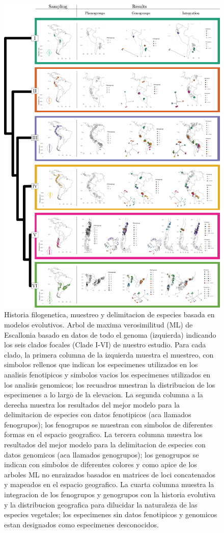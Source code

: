 \documentclass[
  11pt,
]{article}
\begin{document}
\setcounter{figure}{0}
\setcounter{table}{0}
\let\thefigure=\oldthefigure
\let\thetable=\oldthetable

\begin{figure}

{\centering \includegraphics[width=0.7\linewidth,]{figures/Figure1} 

}

\caption{Historia filogenetica, muestreo y delimitacion de especies basada en modelos evolutivos. Arbol de maxima verosimilitud (ML) de Escallonia basado en datos de todo el genoma (izquierda) indicando los seis clados focales (Clade I-VI) de nuestro estudio. Para cada clado, la primera columna de la izquierda muestra el muestreo, con simbolos rellenos que indican los especimenes utilizados en los analisis fenotipicos y simbolos vacios los especimenes utilizados en los analisis genomicos; los recuadros muestran la distribucion de los especimenes a lo largo de la elevacion. La segunda columna a la derecha muestra los resultados del mejor modelo para la delimitacion de especies con datos fenotipicos (aca llamados fenogrupos); los fenogrupos se muestran con simbolos de diferentes formas en el espacio geografico. La tercera columna muestra los resultados del mejor modelo para la delimitacion de especies con datos genomicos (aca llamados genogrupos); los genogrupos se indican con simbolos de diferentes colores y como apice de los arboles ML no enraizados basados en matrices de loci concatenados y mapeados en el espacio geografico. La cuarta columna muestra la integracion de los fenogrupos y genogrupos con la historia evolutiva y la distribucion geografica para dilucidar la naturaleza de las especies vegetales; los especimenes sin datos fenotipicos y genomicos  estan designados como especimenes desconocidos.}\label{fig:figure1}
\end{figure}
\end{document}
